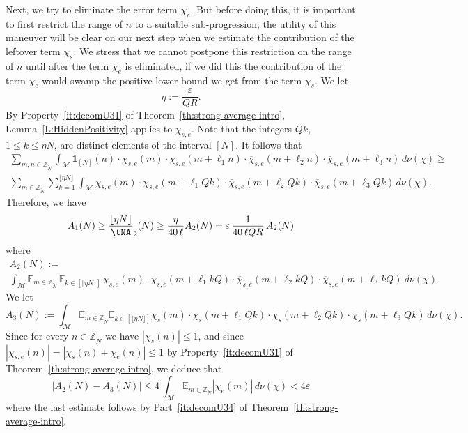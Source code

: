 \documentclass[11pt]{amsart}
\theoremstyle{definition}
\begin{document}
 Next, we try to eliminate the error term $\chi_e$. But before doing this, it is
  important to first restrict the range of $n$ to a suitable sub-progression; the utility of
  this  maneuver will be clear on our next step when we estimate the contribution of the leftover term
  $\chi_s$. We stress that we cannot postpone this restriction on the range of $n$ until after
  the term $\chi_e$ is eliminated, if we did this  the contribution of the term $\chi_e$ would
   swamp the positive lower bound we get from the term $\chi_s$.
 We let
 \begin{equation}
\label{eq:def-epsilon}
\eta:=\frac{\varepsilon}{QR}.
\end{equation}
 By Property~\eqref{it:decomU31} of Theorem~\ref{th:strong-average-intro},
Lemma~\ref{L:HiddenPositivity}  applies to $\chi_{s,e}$. Note that
the integers $Qk$, $1\leq k\leq \eta N$, are distinct elements of
the interval $[N]$.  It follows that
\begin{multline*}
\sum_{m,n\in{{{\mathbb Z}}_{\widetilde N}}}\int_{{\mathcal M}}
{\mathbf{1}}_{[N]}(n)\cdot\chi_{s,e}(m)\cdot\chi_{s,e}(m+\ell_1n)\cdot
\overline{\chi}_{s,e}(m+\ell_2n)\cdot\overline{\chi}_{s,e}(m+\ell_3n)\,d\nu(\chi)\geq
\\
\sum_{m\in{{{\mathbb Z}}_{\widetilde N}}}\sum_{k=1}^{\lfloor \eta N\rfloor}
\int_{{\mathcal M}}
\chi_{s,e}(m)\cdot\chi_{s,e}(m+\ell_1Qk)\cdot
\overline{\chi}_{s,e}(m+\ell_2Qk)\cdot\overline{\chi}_{s,e}(m+\ell_3Qk)\,d\nu(\chi).
\end{multline*}
Therefore, we have
\begin{equation}
\label{eq:A2} A_1(N)\geq \frac{\lfloor\eta N\rfloor}\tNA_2(N)\geq
\frac\eta{40\,\ell}A_2(N) = {\varepsilon}\, \frac{1}{40\,\ell QR}\,A_2(N)
\end{equation}
where
\begin{multline*}
A_2(N):= \\
\int_{{\mathcal M}}  {{\mathbb E}}_{m\in{{{\mathbb Z}}_{\widetilde N}}}\,{{\mathbb E}}_{k\in [\lfloor \eta N\rfloor]}\,
\chi_{s,e}(m)\cdot
\chi_{s,e}(m+\ell_1kQ) \cdot \overline\chi_{s,e}(m+\ell_2kQ) \cdot
\overline\chi_{s,e}(m+\ell_3kQ)\ d\nu(\chi).
\end{multline*}
We let
\begin{equation}
\label{eq:defA3}
A_3(N):= \int_{{\mathcal M}}{{\mathbb E}}_{m\in{{{\mathbb Z}}_{\widetilde N}}}{{\mathbb E}}_{k\in[\lfloor \eta N\rfloor]}
\chi_{s}(m)\cdot\chi_s(m+\ell_1Qk)\cdot
\overline{\chi}_{s}(m+\ell_2Qk)\cdot\overline{\chi}_{s}(m+\ell_3Qk)\,d\nu(\chi).
\end{equation}
Since for every $n\in{{{\mathbb Z}}_{\widetilde N}}$ we have $|\chi_s(n)|\leq 1$, and since
$|\chi_{s,e}(n)|=|\chi_s(n)+\chi_e(n)|\leq 1$ by
Property~\eqref{it:decomU31} of
 Theorem~\ref{th:strong-average-intro}, we deduce that
\begin{equation}
\label{eq:A3}
|A_2(N)-A_3(N)|\leq 4\,\int_{{\mathcal M}}{{\mathbb E}}_{m\in{{{\mathbb Z}}_{\widetilde N}}} |\chi_e(m)|\,d\nu(\chi)<4{\varepsilon}
\end{equation}
where the last estimate follows by Part~\eqref{it:decomU34} of
Theorem~\ref{th:strong-average-intro}.
\end{document}
